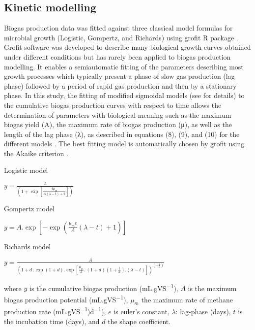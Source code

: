 \subsection{Kinetic modelling}
Biogas production data was fitted against three classical model formulas for microbial growth (Logistic, Gompertz, and Richards) using grofit R package \cite{Kahm_2010}. Grofit software was developed to describe many biological growth curves obtained under different conditions but has rarely been applied to biogas production modelling. It enables a semiautomatic fitting of the parameters describing most growth processes which typically present a phase of slow gas production (lag phase) followed by a period of rapid gas production and then by a stationary phase. In this study, the fitting of modified sigmoidal models (see \cite{Zwietering1990} for details) to the cumulative biogas production curves with respect to time allows the determination of parameters with biological meaning such as the maximum biogas yield (A), the maximum rate of biogas production (μ), as well as the length of the lag phase (λ), as described in equations (8), (9), and (10) for the different models \cite{Zwietering1990,Ware_2017,Alta__2009}. The best fitting model is automatically chosen by grofit using the Akaike criterion \cite{Hasenbrink_2006}.

Logistic model

\(y=\frac{A}{\left(1+\exp\left[\frac{4\mu_m}{A\left(\lambda-t\right)+2}\right]\right)}\)

Gompertz model

\(y=A.\exp\left[-\exp\left(\frac{\mu_me}{A}\left(\lambda-t\right)+1\right)\right]\)

Richards model

\(y=\frac{A}{\left(1+d\ .\exp\left(1+d\right).\exp\left[\frac{\mu_m}{A}.\ \left(1+d\right)\left(1+\frac{1}{d}\right).\left(\lambda-t\right)\right]\right)^{\left(-\frac{1}{d}\right)}}\)

where $y$ is the cumulative biogas production (mL.gVS\textsuperscript{−1}), $A$ is the maximum biogas production potential (mL.gVS\textsuperscript{−1}), $μ_m$ the maximum rate of methane production rate (mL.gVS\textsuperscript{−1})d\textsuperscript{−1}), $e$ is euler's constant, $λ$: lag-phase (days), $t$ is the incubation time (days), and $d$ the shape coefficient.